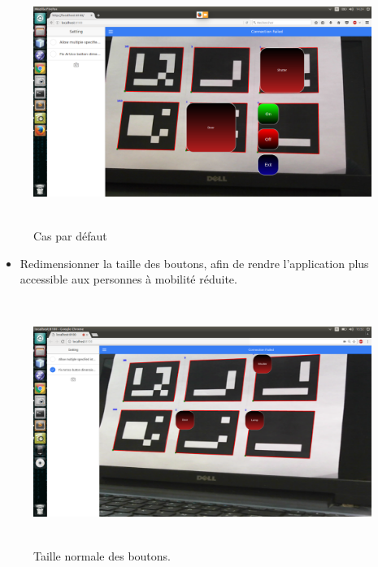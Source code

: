 \documentclass[12pt,a4paper]{article}
\begin{document}
\begin{itemize}
\begin{itemize}
\begin{figure}[H]
\end{figure}
\begin{figure}[H]
  \centering
    \includegraphics[width = 11cm,height=8cm]{4.png}
     \caption{Cas par défaut}
     \label{ihm2}
\end{figure}
\end{itemize}
\begin{itemize}
\item Redimensionner la taille des boutons, afin de rendre l'application plus accessible aux personnes à mobilité réduite.
\end{itemize}
\begin{figure}[H]
  \centering
    \includegraphics[width = 11cm,height=8cm]{6.png}
     \caption{Taille normale des boutons.}
     \label{ihm2}
\end{figure}


\end{itemize}
\end{document}
